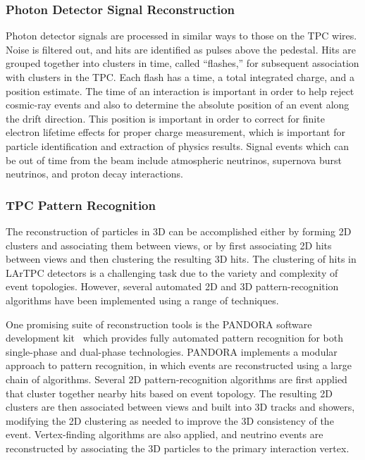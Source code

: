 \subsubsection{Photon Detector Signal Reconstruction}

Photon detector signals are processed in similar ways to those on the TPC wires.
Noise is filtered out, and hits are identified as pulses above the pedestal.
Hits are grouped together into clusters in time, called ``flashes,'' for subsequent
association with clusters in the TPC.  Each flash has a time, a total integrated charge, and a position
estimate.  The time of an interaction is important in order to help reject cosmic-ray events
and also to determine the absolute position of an event along the drift direction.  This position
is important in order to correct for finite electron lifetime effects for proper charge measurement,
which is important for particle identification and extraction of physics results.  Signal events which
can be out of time from the beam include atmospheric neutrinos, supernova burst neutrinos, and proton decay
interactions.

\subsubsection{TPC Pattern Recognition}

The reconstruction of particles in 3D can be accomplished either by forming 2D clusters
and associating them between views, or by first associating 2D hits between views
and then clustering the resulting 3D hits. 
The clustering of hits in LArTPC detectors is a challenging task
due to the variety and complexity of event topologies.
However, several automated 2D and 3D pattern-recognition algorithms have been 
implemented using a range of techniques.

One promising suite of reconstruction tools is the 
PANDORA software development kit~\cite{Marshall:2013bda,Marshall:2012hh}
which provides fully automated pattern recognition for both single-phase 
and dual-phase technologies. 
PANDORA implements a modular approach to pattern recognition,
in which events are reconstructed using a large chain of algorithms. 
Several 2D pattern-recognition algorithms are first applied
that cluster together nearby hits based on event topology.
The resulting 2D clusters are then associated between views
and built into 3D tracks and showers, modifying the 2D clustering 
as needed to improve the 3D consistency of the event. 
Vertex-finding algorithms are also applied,
and neutrino events are reconstructed by associating the 
3D particles to the primary interaction vertex.

